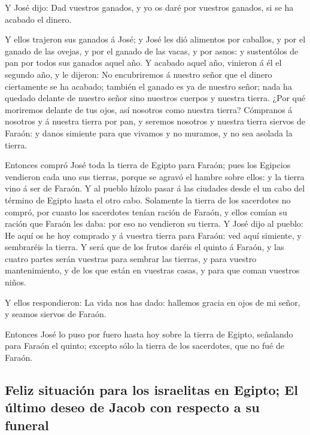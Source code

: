  Y José dijo: Dad vuestros ganados, y yo os daré por
vuestros ganados, si se ha acabado el dinero.

 Y ellos trajeron sus ganados á José; y José les dió
alimentos por caballos, y por el ganado de las ovejas, y por el ganado
de las vacas, y por asnos: y sustentólos de pan por todos sus ganados
aquel año.  Y acabado aquel año, vinieron á él el segundo
año, y le dijeron: No encubriremos á nuestro señor que el dinero
ciertamente se ha acabado; también el ganado es ya de nuestro señor;
nada ha quedado delante de nuestro señor sino nuestros cuerpos y nuestra
tierra.  ¿Por qué moriremos delante de tus ojos, así
nosotros como nuestra tierra? Cómpranos á nosotros y á nuestra tierra
por pan, y seremos nosotros y nuestra tierra siervos de Faraón: y danos
simiente para que vivamos y no muramos, y no sea asolada la tierra.

 Entonces compró José toda la tierra de Egipto para Faraón;
pues los Egipcios vendieron cada uno sus tierras, porque se agravó el
hambre sobre ellos: y la tierra vino á ser de Faraón.  Y al
pueblo hízolo pasar á las ciudades desde el un cabo del término de
Egipto hasta el otro cabo.  Solamente la tierra de los
sacerdotes no compró, por cuanto los sacerdotes tenían ración de Faraón,
y ellos comían su ración que Faraón les daba: por eso no vendieron su
tierra.  Y José dijo al pueblo: He aquí os he hoy comprado
y á vuestra tierra para Faraón: ved aquí simiente, y sembraréis la
tierra.  Y será que de los frutos daréis el quinto á
Faraón, y las cuatro partes serán vuestras para sembrar las tierras, y
para vuestro mantenimiento, y de los que están en vuestras casas, y para
que coman vuestros niños.

 Y ellos respondieron: La vida nos has dado: hallemos
gracia en ojos de mi señor, y seamos siervos de Faraón.

 Entonces José lo puso por fuero hasta hoy sobre la tierra
de Egipto, señalando para Faraón el quinto; excepto sólo la tierra de
los sacerdotes, que no fué de Faraón.

\hypertarget{feliz-situaciuxf3n-para-los-israelitas-en-egipto-el-uxfaltimo-deseo-de-jacob-con-respecto-a-su-funeral}{%
\subsection{Feliz situación para los israelitas en Egipto; El último
deseo de Jacob con respecto a su
funeral}\label{feliz-situaciuxf3n-para-los-israelitas-en-egipto-el-uxfaltimo-deseo-de-jacob-con-respecto-a-su-funeral}}

